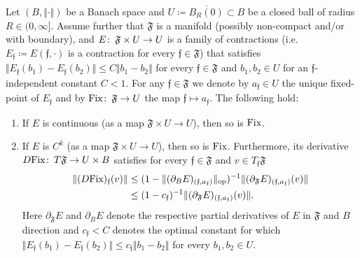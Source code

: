 \documentclass[11pt,a4paper]{scrartcl}
\newcommand{\col}{\colon \thinspace}
\numberwithin{equation}{section}
\theoremstyle{plain}
\theoremstyle{definition}
\theoremstyle{remark}
\begin{document}
\begin{lemma}\label{lem: fixed-points of families}
Let $(B,\Vert \cdot \Vert)$ be a Banach space and $U \coloneqq \overline{B_R(0)}\subset B$ be a closed ball of radius $R\in (0,\infty]$. Assume further that $\mathfrak{F}$ is a manifold (possibly non-compact and/or with boundary), and $E \col \mathfrak{F} \times U \to U$ is a family of contractions (i.e. $E_{\mathfrak{f}} \coloneqq E(\mathfrak{f},\cdot)$ is a contraction for every $\mathfrak{f} \in \mathfrak{F}$) that satisfies $\Vert E_{\mathfrak{f}}(b_1) - E_{\mathfrak{f}}(b_2) \Vert \leq C \Vert b_1 - b_2 \Vert$ for every $\mathfrak{f}\in \mathfrak{F}$ and $b_1,b_2\in U$ for an $\mathfrak{f}$-independent constant $C<1$. For any $\mathfrak{f}\in \mathfrak{F}$ we denote by $a_{\mathfrak{f}}\in U$ the unique fixed-point of $E_{\mathfrak{f}}$ and by $\textup{Fix}\col \mathfrak{F} \to U$ the map $\mathfrak{f} \mapsto a_{\mathfrak{f}}$. The following hold:
\begin{enumerate}
\item If $E$ is continuous (as a map $\mathfrak{F} \times U \to U$), then so is $\textup{Fix}$.
\item If $E$ is $C^k$ (as a map $\mathfrak{F} \times U \to U$), then so is $\textup{Fix}$. Furthermore, its derivative $D\textup{Fix} \col T \mathfrak{F} \to U\times B$ satisfies for every $\mathfrak{f}\in \mathfrak{F}$ and $v\in T_\mathfrak{f}\mathfrak{F}$ 
\begin{align*}
\Vert (D \textup{Fix})_\mathfrak{f}(v) \Vert &\leq (1- \Vert (\partial_BE)_{(\mathfrak{f},a_\mathfrak{f})} \Vert_{\textup{op}})^{-1} \Vert (\partial_{\mathfrak{F}} E)_{(\mathfrak{f},a_\mathfrak{f})}(v) \Vert \\
& \leq  (1- c_\mathfrak{f})^{-1} \Vert (\partial_{\mathfrak{F}} E)_{(\mathfrak{f},a_\mathfrak{f})}(v) \Vert.
\end{align*} 
Here $\partial_{\mathfrak{F}}E$ and $\partial_BE$ denote the respective partial derivatives of $E$ in $\mathfrak{F}$ and $B$ direction and $c_\mathfrak{f}<C$ denotes the optimal constant for which $ \Vert E_\mathfrak{f}(b_1) -E_\mathfrak{f}(b_2) \Vert \leq c_\mathfrak{f} \Vert b_1 - b_2 \Vert$ for every $b_1,b_2 \in U$.
\end{enumerate}
\end{lemma}
\end{document}
